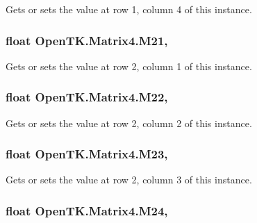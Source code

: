 Gets or sets the value at row 1, column 4 of this instance. 

\hypertarget{struct_open_t_k_1_1_matrix4_a8f67e786091e1e1c3bb2de5526f200e2}{
\subsubsection[{M21}]{\setlength{\rightskip}{0pt plus 5cm}float Open\-T\-K.\-Matrix4.\-M21\hspace{0.3cm}{\ttfamily [get]}, {\ttfamily [set]}}}\label{struct_open_t_k_1_1_matrix4_a8f67e786091e1e1c3bb2de5526f200e2}


Gets or sets the value at row 2, column 1 of this instance. 

\hypertarget{struct_open_t_k_1_1_matrix4_a0e052302d09a03c29a0acd5062be45de}{
\subsubsection[{M22}]{\setlength{\rightskip}{0pt plus 5cm}float Open\-T\-K.\-Matrix4.\-M22\hspace{0.3cm}{\ttfamily [get]}, {\ttfamily [set]}}}\label{struct_open_t_k_1_1_matrix4_a0e052302d09a03c29a0acd5062be45de}


Gets or sets the value at row 2, column 2 of this instance. 

\hypertarget{struct_open_t_k_1_1_matrix4_a833d47673ced755298c9be945e198d63}{
\subsubsection[{M23}]{\setlength{\rightskip}{0pt plus 5cm}float Open\-T\-K.\-Matrix4.\-M23\hspace{0.3cm}{\ttfamily [get]}, {\ttfamily [set]}}}\label{struct_open_t_k_1_1_matrix4_a833d47673ced755298c9be945e198d63}


Gets or sets the value at row 2, column 3 of this instance. 

\hypertarget{struct_open_t_k_1_1_matrix4_a10cd1d863df4b0e82713451981b10cb3}{
\subsubsection[{M24}]{\setlength{\rightskip}{0pt plus 5cm}float Open\-T\-K.\-Matrix4.\-M24\hspace{0.3cm}{\ttfamily [get]}, {\ttfamily [set]}}}\label{struct_open_t_k_1_1_matrix4_a10cd1d863df4b0e82713451981b10cb3}


